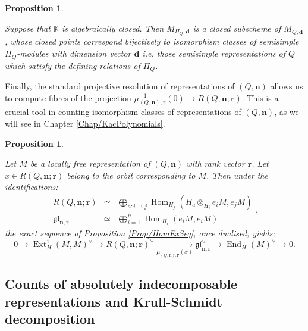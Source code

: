 \documentclass[11pt,english]{article}
\numberwithin{equation}{section}
\numberwithin{figure}{section}
\theoremstyle{definition}
\theoremstyle{plain}
\newtheorem{prop}[df]{Proposition}
\theoremstyle{remark}
\DeclareMathOperator{\End}{End}
\DeclareMathOperator{\Hom}{Hom}
\DeclareMathOperator{\Ext}{Ext}
\newcommand\dd{\mathbf{d}}
\newcommand\nn{\mathbf{n}}
\newcommand\rr{\mathbf{r}}
\newcommand\KK{\mathbb{K}}
\begin{document}
\begin{prop}{\cite[Ch. 1.2, Proof of Thm. 1.1, Fact (3)]{MFK94}}

Suppose that $\KK$ is algebraically closed. Then $M_{\Pi_{Q},\dd}$
is a closed subscheme of $M_{\overline{Q},\dd}$, whose closed points
correspond bijectively to isomorphism classes of semisimple $\Pi_{Q}$-modules
with dimension vector $\dd$ i.e. those semisimple representations
of $\overline{Q}$ which satisfy the defining relations of $\Pi_{Q}$.

\end{prop}

Finally, the standard projective resolution of representations of
$(Q,\nn)$ allows us to compute fibres of the projection $\mu_{(Q,\nn),\rr}^{-1}(0)\rightarrow R(Q,\nn;\rr)$.
This is a crucial tool in counting isomorphism classes of representations
of $(Q,\nn)$, as we will see in Chapter \ref{Chap/KacPolynomials}.

\begin{prop} \label{Prop/MomMapExSeq}

Let $M$ be a locally free representation of $(Q,\nn)$ with rank
vector $\rr$. Let $x\in R(Q,\nn;\rr)$ belong to the orbit corresponding
to $M$. Then under the identifications:\[
\begin{array}{rcl}
R(Q,\nn;\rr) & \simeq & \bigoplus_{a:i\rightarrow j}\Hom_{H_j}(H_a\otimes_{H_i}e_iM,e_jM) \\
\mathfrak{gl}_{\nn,\rr} & \simeq & \bigoplus_{i=1}^n\Hom_{H_i}(e_iM,e_iM)
\end{array}
,
\] the exact sequence of Proposition \ref{Prop/HomExSeq}, once dualised,
yields:\[
0\rightarrow
\Ext_H^1(M,M)^{\vee}\rightarrow
R(Q,\nn;\rr)^{\vee}\underset{\mu_{(Q,\nn),\rr}(x)}{\longrightarrow}
\mathfrak{gl}_{\nn,\rr}^{\vee}\rightarrow
\End_H(M)^{\vee}\rightarrow 0.
\]

\end{prop}

\subsection{Counts of absolutely indecomposable representations and Krull-Schmidt
decomposition \label{Subsect/KrullSchmidt}}
\end{document}
